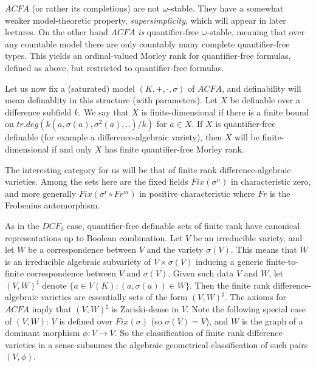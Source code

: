 $ACFA$ (or rather its completions) are not
$\omega$-stable. They have a somewhat weaker
model-theoretic property, {\em
supersimplicity}, which will appear in later
lectures. On the other hand $ACFA$ {\em is}
quantifier-free $\omega$-stable, meaning that
over any countable model there are only
countably many complete quantifier-free types.
This  yields an ordinal-valued Morley rank for
quantifier-free formulas, defined as above,
but restricted to quantifier-free formulas.

Let us now fix a (saturated) model
$(K,+,\cdot,\sigma)$ of $ACFA$, and
definability will mean definablity in this
structure (with parameters). Let
$X$ be definable over a difference subfield
$k$. We say that $X$ is finite-dimensional if
there is a finite bound on
$tr.deg(k(a,\sigma(a),\sigma^{2}(a),..)/k)$
for $a\in X$. If $X$ is quantifier-free
definable (for example a difference-algebraic
variety), then $X$ will be finite-dimensional
if and only $X$ has finite
quantifier-free Morley rank.

The interesting category for us will be
that of finite rank difference-algebraic
varieties. Among the sets here are the fixed
fields $Fix(\sigma^{n})$ in characteristic
zero, and more generally
$Fix(\sigma^{r}\circ Fr^{m})$ in positive
characteristic where
$Fr$ is the Frobenius automorphism.

As in the
$DCF_{0}$ case, quantifier-free definable sets
of finite rank have canonical representations
up to Boolean combination.  Let $V$ be an
irreducible variety, and let $W$ be a
correspondence between $V$ and the variety
$\sigma(V)$. This means that $W$ is an
irreducible algebraic subvariety of
$V\times\sigma(V)$ inducing a generic
finite-to-finite correspondence between $V$
and $\sigma(V)$. Given such data $V$ and
$W$, let $(V,W)^{\sharp}$ denote
$\{a\in V(K): (a,\sigma(a))\in W\}$. Then the
finite rank difference-algebraic varieties are
essentially sets of the form $(V,W)^{\sharp}$.
The axioms for $ACFA$ imply that
$(V,W)^{\sharp}$ is Zariski-dense in $V$. Note
the following special case of $(V,W)$: $V$ is
defined over $Fix(\sigma)$ (so $\sigma(V) =
V$), and $W$ is the graph of a dominant
morphism $\phi:V\rightarrow V$. So the
classification of finite rank difference
varieties in a sense subsumes the
algebraic geometrical classification of such
pairs
$(V,\phi)$.

